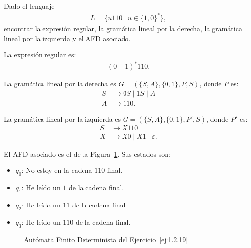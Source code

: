 \begin{ejercicio} \label{ej:1.2.19}
    Dado el lenguaje
    \begin{align*}
        L = \{u110 \mid u \in \{1, 0\}^*\},
    \end{align*}
    encontrar la expresión regular, la gramática lineal por la derecha, la gramática lineal por la izquierda y el AFD asociado.

    La expresión regular es:
    \begin{align*}
        (0+1)^*110.
    \end{align*}

    La gramática lineal por la derecha es $G=(\{S,A\}, \{0, 1\}, P, S)$, donde $P$ es:
    \begin{align*}
        S &\to 0S \mid 1S \mid A\\
        A &\to 110.
    \end{align*}

    La gramática lineal por la izquierda es $G=(\{S,A\}, \{0, 1\}, P', S)$, donde $P'$ es:
    \begin{align*}
        S &\to X110\\
        X &\to X0 \mid X1 \mid \varepsilon.
    \end{align*}

    El AFD asociado es el de la Figura~\ref{fig:ej:1.2.19}. Sus estados son:
    \begin{itemize}
        \item \ul{$q_0$}: No estoy en la cadena $110$ final.
        \item \ul{$q_1$}: He leído un $1$ de la cadena final.
        \item \ul{$q_2$}: He leído un $11$ de la cadena final.
        \item \ul{$q_3$}: He leído un $110$ de la cadena final.
    \end{itemize}
    \begin{figure}
        \centering
        \caption{Autómata Finito Determinista del Ejercicio~\ref{ej:1.2.19}}
        \label{fig:ej:1.2.19}
    \end{figure}
\end{ejercicio}

